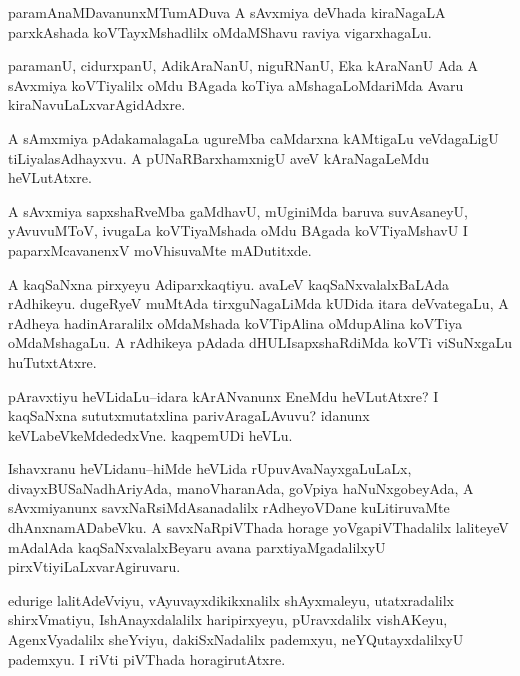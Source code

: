 \documentclass{article}
\begin{document}
\begin{mn}%
paramAnaMDavanunxMTumADuva A sAvxmiya deVhada kiraNagaLA parxkAshada koVTayxMshadlilx 
oMdaMShavu raviya vigarxhagaLu. 
\end{mn}

\begin{mn}%
paramanU, cidurxpanU, AdikAraNanU, niguRNanU, Eka kAraNanU Ada A sAvxmiya koVTiyalilx oMdu 
BAgada koTiya aMshagaLoMdariMda Avaru kiraNavuLaLxvarAgidAdxre.
\end{mn}

\begin{mn}%
A sAmxmiya pAdakamalagaLa ugureMba caMdarxna kAMtigaLu veVdagaLigU tiLiyalasAdhayxvu. A 
pUNaRBarxhamxnigU aveV kAraNagaLeMdu heVLutAtxre.
\end{mn}

\begin{mn}%
A sAvxmiya sapxshaRveMba gaMdhavU, mUginiMda baruva suvAsaneyU, yAvuvuMToV, ivugaLa 
koVTiyaMshada oMdu BAgada koVTiyaMshavU I paparxMcavanenxV moVhisuvaMte mADutitxde.
\end{mn}

\begin{mn}%
A kaqSaNxna pirxyeyu Adiparxkaqtiyu. avaLeV kaqSaNxvalalxBaLAda rAdhikeyu. dugeRyeV 
muMtAda tirxguNagaLiMda kUDida itara deVvategaLu, A rAdheya hadinAraralilx oMdaMshada 
koVTipAlina oMdupAlina koVTiya oMdaMshagaLu. A rAdhikeya pAdada dHULIsapxshaRdiMda koVTi 
viSuNxgaLu huTutxtAtxre.
\end{mn}


\begin{mn}%
pAravxtiyu heVLidaLu--idara kArANvanunx EneMdu heVLutAtxre? I kaqSaNxna sututxmutatxlina 
parivAragaLAvuvu? idanunx keVLabeVkeMdededxVne. kaqpemUDi heVLu.
\end{mn}

\begin{mn}%
Ishavxranu heVLidanu--hiMde heVLida rUpuvAvaNayxgaLuLaLx, divayxBUSaNadhAriyAda, 
manoVharanAda, goVpiya haNuNxgobeyAda, A sAvxmiyanunx savxNaRsiMdAsanadalilx rAdheyoVDane 
kuLitiruvaMte dhAnxnamADabeVku. A savxNaRpiVThada horage yoVgapiVThadalilx laliteyeV 
mAdalAda kaqSaNxvalalxBeyaru avana parxtiyaMgadalilxyU pirxVtiyiLaLxvarAgiruvaru.
\end{mn}

\begin{mn}%
edurige lalitAdeVviyu, vAyuvayxdikikxnalilx shAyxmaleyu, utatxradalilx shirxVmatiyu, 
IshAnayxdalalilx haripirxyeyu, pUravxdalilx vishAKeyu, AgenxVyadalilx sheYviyu, 
dakiSxNadalilx pademxyu, neYQutayxdalilxyU pademxyu. I riVti piVThada horagirutAtxre.
\end{mn}
\end{document}
